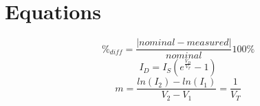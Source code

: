 \documentclass{article}
\begin{document}
\section{Equations}
\label{sec:equations}

%
\begin{equation}
  \label{eq:percent_diff}
  \%_{diff} = \frac{|nominal - measured|}{nominal}100\%
\end{equation}
%
\begin{equation}
  \label{eq:schockley}
  I_D = I_S \left(e^{\frac{V_D}{V_T}} - 1\right)
\end{equation}
%
  \begin{equation}
  \label{eq:m}
    m = \frac{ln(I_2)-ln(I_1)}{V_2-V_1} = \frac{1}{V_T}
\end{equation}
\end{document}
